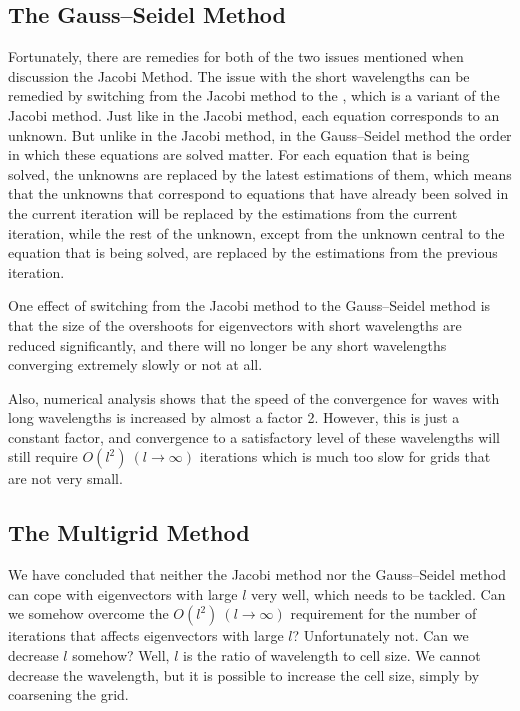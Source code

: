 \subsection{The Gauss--Seidel Method}

Fortunately, there are remedies for both of the two issues mentioned when discussion the Jacobi Method. The issue with the short wavelengths can be remedied by switching from the Jacobi method to the , which is a variant of the Jacobi method. Just like in the Jacobi method, each equation corresponds to an unknown. But unlike in the Jacobi method, in the Gauss--Seidel method the order in which these equations are solved matter. For each equation that is being solved, the unknowns are replaced by the latest estimations of them, which means that the unknowns that correspond to equations that have already been solved in the current iteration will be replaced by the estimations from the current iteration, while the rest of the unknown, except from the unknown central to the equation that is being solved, are replaced by the estimations from the previous iteration.

One effect of switching from the Jacobi method to the Gauss--Seidel method is that the size of the overshoots for eigenvectors with short wavelengths are reduced significantly, and there will no longer be any short wavelengths converging extremely slowly or not at all.

Also, numerical analysis shows that the speed of the convergence for waves with long wavelengths is increased by almost a factor 2. However, this is just a constant factor, and convergence to a satisfactory level of these wavelengths will still require $O(l^2)\ (l\to\infty)$ iterations which is much too slow for grids that are not very small.

\subsection{The Multigrid Method}

We have concluded that neither the Jacobi method nor the Gauss--Seidel method can cope with eigenvectors with large $l$ very well, which needs to be tackled. Can we somehow overcome the $O(l^2)\ (l\to\infty)$ requirement for the number of iterations that affects eigenvectors with large $l$? Unfortunately not. Can we decrease $l$ somehow? Well, $l$ is the ratio of wavelength to cell size. We cannot decrease the wavelength, but it is possible to increase the cell size, simply by coarsening the grid.

